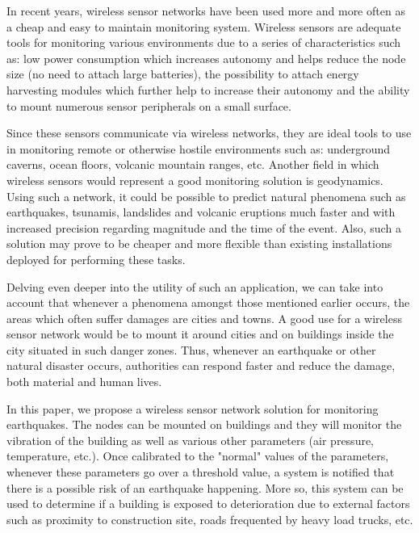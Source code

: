 In recent years, wireless sensor networks have been used more and more often as a cheap and easy to maintain monitoring system.
Wireless sensors are adequate tools for monitoring various environments due to a series of characteristics such as: low power 
consumption which increases autonomy and helps reduce the node size (no need to attach large batteries), the possibility to 
attach energy harvesting modules which further help to increase their autonomy and the ability to mount numerous sensor peripherals 
on a small surface.

Since these sensors communicate via wireless networks, they are ideal tools to use in monitoring remote or otherwise hostile 
environments such as: underground caverns, ocean floors, volcanic mountain ranges, etc. Another field in which wireless sensors 
would represent a good monitoring solution is geodynamics. Using such a network, it could be
possible to predict natural phenomena such 
as earthquakes, tsunamis, landslides and volcanic eruptions much faster and with increased precision regarding magnitude and the 
time of the event. Also, such a solution may prove to be cheaper and more flexible than existing installations deployed for performing 
these tasks.

Delving even deeper into the utility of such an application, we can take into account that whenever a phenomena amongst those mentioned 
earlier occurs, the areas which often suffer damages are cities and towns. A good use for a wireless sensor network would be to mount it 
around cities and on buildings inside the city situated in such danger zones. Thus, whenever an earthquake or other natural disaster occurs, 
authorities can respond faster and reduce the damage, both material and human lives.

In this paper, we propose a wireless sensor network solution for monitoring earthquakes. The nodes
can be mounted on buildings and 
they will monitor the vibration of the building as well as various other parameters (air pressure, temperature, etc.). Once calibrated 
to the "normal" values of the parameters, whenever these parameters go over a threshold value, a system is notified that there is a possible 
risk of an earthquake happening. More so, this system can be used to determine if a building is
exposed to deterioration due to external factors such as proximity 
to construction site, roads frequented by heavy load trucks, etc.
